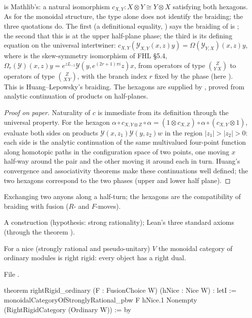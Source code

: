 \begin{dictionary}
 is Mathlib's: a natural isomorphism $c_{X,Y}:X\otimes Y\cong Y\otimes X$ satisfying both hexagons.
As for the monoidal structure, the type alone does not identify the braiding; the three quotations do. The first (a
definitional equality, ) says the braiding of  is
; the second that this is  at the upper half-plane phase; the third is its defining
equation on the universal intertwiner: $c_{X,Y}(\mathcal Y_{X,Y}(x,z)y)=\Omega(\mathcal Y_{Y,X})(x,z)y$, where
 is the skew-symmetry isomorphism of FHL §5.4, $\Omega_r(\mathcal Y)(x,z)y=e^{zL_{-1}}\mathcal
Y(y,e^{(2r+1)\pi i}z)x$, from operators of type $\binom{Z}{Y\,X}$ to operators of type $\binom{Z}{X\,Y}$, with the branch
index $r$ fixed by the phase  (here ). This is Huang--Lepowsky's braiding. The hexagons are supplied by
, proved from analytic continuation of products on half-planes.
\end{dictionary}

\begin{proof}[Proof on paper]
Naturality of $c$ is immediate from its definition through the universal property. For the hexagon
$\alpha\circ c_{X,Y\otimes Z}\circ\alpha=(1\otimes c_{X,Z})\circ\alpha\circ(c_{X,Y}\otimes 1)$, evaluate both sides on
products $\mathcal Y(x,z_1)\mathcal Y(y,z_2)w$ in the region $|z_1|>|z_2|>0$: each side is the analytic continuation of
the same multivalued four-point function along homotopic paths in the configuration space of two points, one moving
$x$ half-way around the pair and the other moving it around each in turn. Huang's convergence and associativity
theorems make these continuations well defined; the two hexagons correspond to the two phases (upper and lower half
plane).
\end{proof}

\begin{physics}
Exchanging two anyons along a half-turn; the hexagons are the compatibility of braiding with fusion ($R$- and $F$-moves).
\end{physics}

\begin{status}
A construction (hypothesis: strong rationality); Lean's three standard axioms (through the theorem ).
\end{status}

\begin{theorem}\label{l21:thm:rigid}
For a nice (strongly rational and pseudo-unitary) $V$ the monoidal category of ordinary modules is right rigid: every
object has a right dual.
\end{theorem}
\noindent File .
\begin{leancode}
theorem rightRigid_ordinary (F : FusionChoice W) (hNice : Nice W) :
    letI := monoidalCategoryOfStronglyRational_pbw F hNice.1
    Nonempty (RightRigidCategory (Ordinary W)) := by
\end{leancode}

